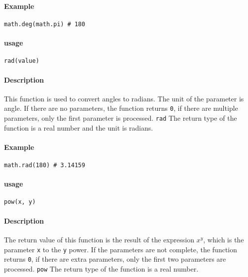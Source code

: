 \paragraph{Example}
\begin{lstlisting}[language=berry, numbers=none]
math.deg(math.pi) # 180
\end{lstlisting}


\paragraph{usage}
\begin{lstlisting}[language=berry, numbers=none]
rad(value)
\end{lstlisting}

\paragraph{Description}
This function is used to convert angles to radians. The unit of the parameter is angle. If there are no parameters, the function returns \texttt{0}, if there are multiple parameters, only the first parameter is processed. \texttt{rad} The return type of the function is a real number and the unit is radians.

\paragraph{Example}
\begin{lstlisting}[language=berry, numbers=none]
math.rad(180) # 3.14159
\end{lstlisting}


\paragraph{usage}
\begin{lstlisting}[language=berry, numbers=none]
pow(x, y)
\end{lstlisting}

\paragraph{Description}
The return value of this function is the result of the expression $x^y$, which is the parameter \texttt{x} to the \texttt{y} power. If the parameters are not complete, the function returns \texttt{0}, if there are extra parameters, only the first two parameters are processed. \texttt{pow} The return type of the function is a real number.

